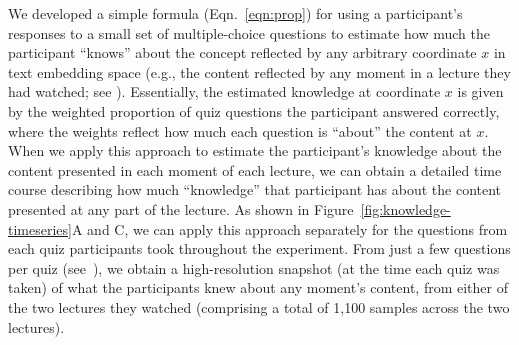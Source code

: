 \documentclass[10pt]{article}
\renewcommand{\nameref}[1]{\mbox{\textit{\oldnameref{#1}}}}
\begin{document}
We developed a simple formula (Eqn.~\ref{eqn:prop}) for using a participant's
responses to a small set of multiple-choice questions to estimate how much the
participant ``knows'' about the concept reflected by any arbitrary coordinate
$x$ in text embedding space (e.g., the content reflected by any moment in a
lecture they had watched; see \nameref{subsec:traces}). Essentially, the
estimated knowledge at coordinate $x$ is given by the weighted
proportion of quiz questions the participant answered correctly, where the
weights reflect how much each question is ``about'' the content at $x$. When we
apply this approach to estimate the participant's knowledge about the content
presented in each moment of each lecture, we can obtain a detailed time course
describing how much ``knowledge'' that participant has about the content
presented at any part of the lecture. As shown in
Figure~\ref{fig:knowledge-timeseries}A and C, we can apply this approach
separately for the questions from each quiz participants took throughout the
experiment. From just a few questions per quiz (see~\nameref{subsec:traces}),
we obtain a high-resolution snapshot (at the time each quiz was taken) of what
the participants knew about any moment's content, from either of the two
lectures they watched (comprising a total of 1,100 samples across the two
lectures).
\end{document}
